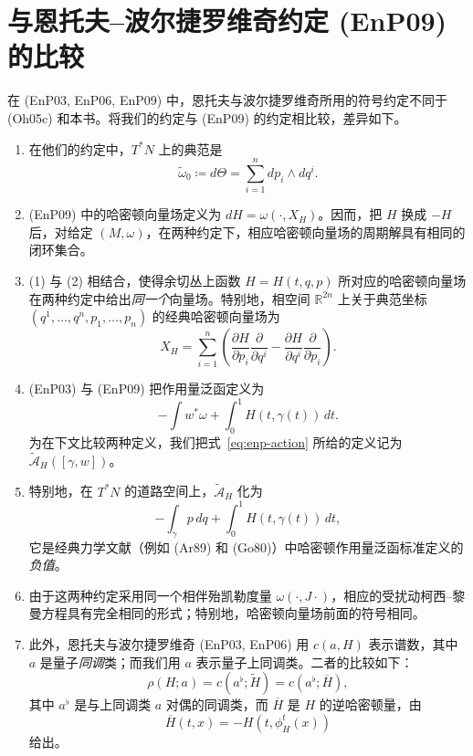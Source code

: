\section*{与恩托夫--波尔捷罗维奇约定 (EnP09) 的比较}

在 (EnP03, EnP06, EnP09) 中，恩托夫与波尔捷罗维奇所用的符号约定不同于 (Oh05c) 和本书。将我们的约定与 (EnP09) 的约定相比较，差异如下。

\begin{enumerate}[label=(\arabic*)]
  \item 在他们的约定中，$T^*N$ 上的典范\termSymplecticForm{}是
  \[
    \widetilde\omega_0\coloneqq d\Theta=\sum_{i=1}^n dp_i\wedge dq^i.
  \]

  \item (EnP09) 中的哈密顿向量场定义为 $dH=\omega(\cdot,X_H)$。因而，把 $H$ 换成 $-H$ 后，对给定\termSymplecticManifold{} $(M,\omega)$，在两种约定下，相应哈密顿向量场的周期解具有相同的闭环集合。

  \item (1) 与 (2) 相结合，使得余切丛上函数 $H=H(t,q,p)$ 所对应的哈密顿向量场在两种约定中给出\emph{同一个}向量场。特别地，相空间 $\mathbb R^{2n}$ 上关于典范坐标 $(q^1,\ldots,q^n,p_1,\ldots,p_n)$ 的经典哈密顿向量场为
  \[
    X_H=\sum_{i=1}^n\left(
      \frac{\partial H}{\partial p_i}\frac{\partial}{\partial q^i}
      -\frac{\partial H}{\partial q^i}\frac{\partial}{\partial p_i}
    \right).
  \]

  \item (EnP03) 与 (EnP09) 把作用量泛函定义为
  \begin{equation}\tag{0.0.1}\label{eq:enp-action}
    -\int w^*\omega+\int_0^1 H(t,\gamma(t))\,dt.
  \end{equation}
  为在下文比较两种定义，我们把式~\eqref{eq:enp-action} 所给的定义记为 $\widetilde{\mathcal A}_H([\gamma,w])$。

  \item 特别地，在 $T^*N$ 的道路空间上，$\widetilde{\mathcal A}_H$ 化为
  \[
    -\int_\gamma p\,dq+\int_0^1 H(t,\gamma(t))\,dt,
  \]
  它是经典力学文献（例如 (Ar89) 和 (Go80)）中哈密顿作用量泛函标准定义的\emph{负值}。

  \item 由于这两种约定采用同一个相伴殆凯勒度量 $\omega(\cdot,J\cdot)$，相应的受扰动柯西--黎曼方程具有完全相同的形式；特别地，哈密顿向量场前面的符号相同。

  \item 此外，恩托夫与波尔捷罗维奇 (EnP03, EnP06) 用 $c(a,H)$ 表示谱数，其中 $a$ 是量子\emph{同调}类；而我们用 $a$ 表示量子上同调类。二者的比较如下：
  \begin{equation}\tag{0.0.2}\label{eq:enp-spectral-comparison}
    \rho(H;a)=c(a^\flat;\widetilde H)=c(a^\flat;\overline H),
  \end{equation}
  其中 $a^\flat$ 是与上同调类 $a$ 对偶的同调类，而 $\overline H$ 是 $H$ 的逆哈密顿量，由
  \begin{equation}\tag{0.0.3}\label{eq:inverse-hamiltonian}
    \overline H(t,x)=-H(t,\phi_H^t(x))
  \end{equation}
  给出。


\end{enumerate}
